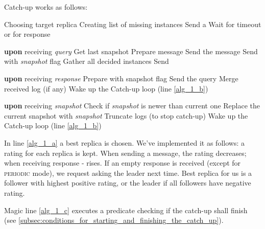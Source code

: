 Catch-up works as follows:

\begin{algorithmic}[1]
  \REPEAT
    \STATE \label{alg_1_a} Choosing target replica
    \STATE Creating list of missing instances
    \STATE Send a \catchUpQuery
    \STATE \label{alg_1_b} Wait for timeout or for response
  
  \vspace{1em}
  
  \STATE \textbf{upon} receiving \catchUpQuery \textit{query}
      \STATE Get last snapshot
      \STATE Prepare \catchUpSnapshot message
      \STATE Send the message
      \STATE Send \catchUpResponse with \textit{snapshot} flag
    \ELSE
      \STATE Gather all decided instances
      \STATE Send \catchUpResponse
    \ENDIF

  \vspace{1em}
  \STATE \textbf{upon} receiving \catchUpResponse \textit{response}
      \STATE Prepare \catchUpQuery with snapshot flag
      \STATE Send the query
    \ELSE
      \STATE Merge received log (if any)
      \STATE Wake up the Catch-up loop (line \ref{alg_1_b})
    \ENDIF
  
  \vspace{1em}
  \STATE \textbf{upon} receiving \catchUpSnapshot \textit{snapshot}
  \STATE Check if \textit{snapshot} is newer than current one
  \STATE Replace the current snapshot with \textit{snapshot}
  \STATE Truncate logs (to stop catch-up)
  \STATE Wake up the Catch-up loop (line \ref{alg_1_b})

\end{algorithmic}

\vspace{1em}

In line \ref{alg_1_a} a best replica is chosen. We've implemented it as follows: a rating for each replica is kept. When sending a message, the rating decreases; when receiving response - rises. If an empty response is received (except for \textsc{periodic} mode), we request asking the leader next time. Best replica for us is a follower with highest positive rating, or the leader if all followers have negative rating.

Magic line \ref{alg_1_c} executes a predicate checking if the catch-up shall finish (see \ref{subsec:conditions_for_starting_and_finishing_the_catch_up}).

